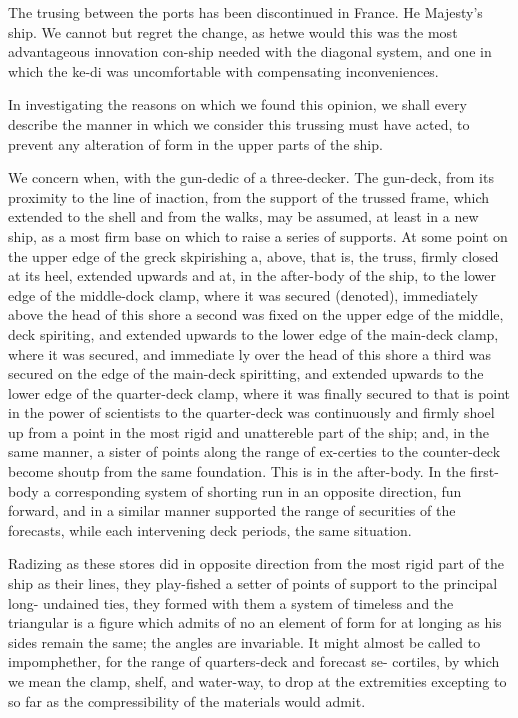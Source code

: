 \documentclass{article}
\begin{document}
The trusing between the ports has been discontinued in France. He Majesty's ship. We cannot but regret the change, as hetwe would this was the most advantageous innovation con-ship needed with the diagonal system, and one in which the ke-di was uncomfortable with compensating inconveniences.

In investigating the reasons on which we found this opinion, we shall every describe the manner in which we consider this trussing must have acted, to prevent any alteration of form in the upper parts of the ship.

We concern when, with the gun-dedic of a three-decker. The gun-deck, from its proximity to the line of inaction, from the support of the trussed frame, which extended to the shell and from the walks, may be assumed, at least in a new ship, as a most firm base on which to raise a series of supports. At some point on the upper edge of the greck skpirishing a, above, that is, the truss, firmly closed at its heel, extended upwards and at, in the after-body of the ship, to the lower edge of the middle-dock clamp, where it was secured (denoted), immediately above the head of this shore a second was fixed on the upper edge of the middle, deck spiriting, and extended upwards to the lower edge of the main-deck clamp, where it was secured, and immediate ly over the head of this shore a third was secured on the edge of the main-deck spiritting, and extended upwards to the lower edge of the quarter-deck clamp, where it was finally secured to that is point in the power of scientists to the quarter-deck was continuously and firmly shoel up from a point in the most rigid and unattereble part of the ship; and, in the same manner, a sister of points along the range of ex-certies to the counter-deck become shoutp from the same foundation. This is in the after-body. In the first-body a corresponding system of shorting run in an opposite direction, fun forward, and in a similar manner supported the range of securities of the forecasts, while each intervening deck periods, the same situation.

Radizing as these stores did in opposite direction from the most rigid part of the ship as their lines, they play-fished a setter of points of support to the principal long- undained ties, they formed with them a system of timeless and the triangular is a figure which admits of no an element of form for at longing as his sides remain the same; the angles are invariable. It might almost be called to impomphether, for the range of quarters-deck and forecast se- cortiles, by which we mean the clamp, shelf, and water-way, to drop at the extremities excepting to so far as the compressibility of the materials would admit.
\end{document}
